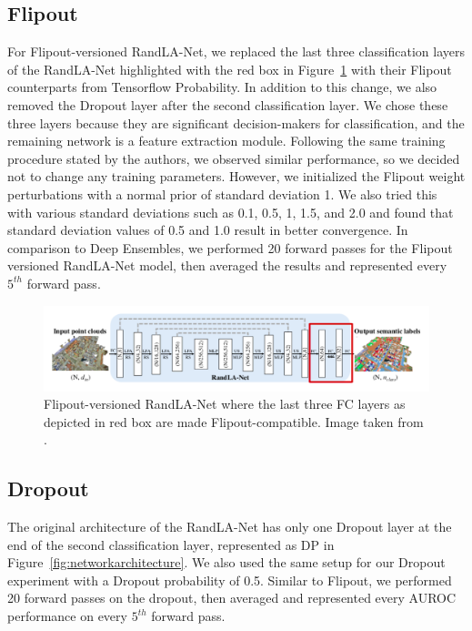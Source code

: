     \subsection{Flipout}
    \label{sec:flipout_setup}
    For Flipout-versioned RandLA-Net, we replaced the last three classification layers of the RandLA-Net highlighted with the red box in Figure~\ref{fig:fout_randlanet} with their Flipout counterparts from Tensorflow Probability.
    In addition to this change, we also removed the Dropout layer after the second classification layer.
    We chose these three layers because they are significant decision-makers for classification, and the remaining network is a feature extraction module.
    Following the same training procedure stated by the authors, we observed similar performance, so we decided not to change any training parameters.
    However, we initialized the Flipout weight perturbations with a normal prior of standard deviation 1.
    We also tried this with various standard deviations such as 0.1, 0.5, 1, 1.5, and 2.0 and found that standard deviation values of 0.5 and 1.0 result in better convergence.
    In comparison to Deep Ensembles, we performed 20 forward passes for the Flipout versioned RandLA-Net model, then averaged the results and represented every $5^{th}$ forward pass.
    \begin{figure}
        \centering
        \includegraphics[scale=0.42]{images/fout_randlanet.png}
        \caption{Flipout-versioned RandLA-Net where the last three FC layers as depicted in red box are made Flipout-compatible. Image taken from \cite{Hu_2020_CVPR_Randla}.}
        \label{fig:fout_randlanet}
    \end{figure}
    \subsection{Dropout}
    \label{sec:randladout}
    The original architecture of the RandLA-Net has only one Dropout layer at the end of the second classification layer, represented as DP in Figure~\ref{fig:networkarchitecture}.
    We also used the same setup for our Dropout experiment with a Dropout probability of 0.5.
    Similar to Flipout, we performed 20 forward passes on the dropout, then averaged and represented every AUROC performance on every $5^{th}$ forward pass.



